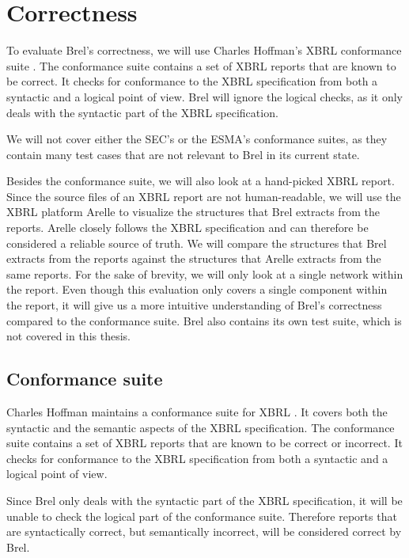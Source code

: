 \section{Correctness}
\label{sec:correctness}

To evaluate Brel's correctness, we will use Charles Hoffman's XBRL conformance suite \cite{hoffman_conformance_suite}.
The conformance suite contains a set of XBRL reports that are known to be correct.
It checks for conformance to the XBRL specification from both a syntactic and a logical point of view.
Brel will ignore the logical checks, as it only deals with the syntactic part of the XBRL specification.

We will not cover either the SEC's or the ESMA's conformance suites, 
as they contain many test cases that are not relevant to Brel in its current state.

Besides the conformance suite, we will also look at a hand-picked XBRL report.
Since the source files of an XBRL report are not human-readable, 
we will use the XBRL platform Arelle\cite{arelle} to visualize the structures that Brel extracts from the reports.
Arelle closely follows the XBRL specification and can therefore be considered a reliable source of truth.
We will compare the structures that Brel extracts from the reports against the structures that Arelle extracts from the same reports.
For the sake of brevity, we will only look at a single network within the report.
Even though this evaluation only covers a single component within the report,
it will give us a more intuitive understanding of Brel's correctness compared to the conformance suite.
Brel also contains its own test suite, which is not covered in this thesis.

\subsection{Conformance suite}

Charles Hoffman maintains a conformance suite for XBRL \cite{hoffman_conformance_suite}.
It covers both the syntactic and the semantic aspects of the XBRL specification.
The conformance suite contains a set of XBRL reports that are known to be correct or incorrect.
It checks for conformance to the XBRL specification from both a syntactic and a logical point of view.

Since Brel only deals with the syntactic part of the XBRL specification, 
it will be unable to check the logical part of the conformance suite.
Therefore reports that are syntactically correct, but semantically incorrect, will be considered correct by Brel.

